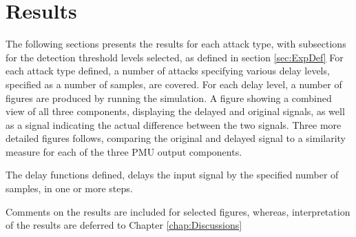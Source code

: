 \chapter{Results} \label{chap:Results}


The following sections presents the results for each attack type, with subsections for the detection threshold levels selected, as defined in section \ref{sec:ExpDef} 
For each attack type defined, a number of attacks specifying various delay levels, specified as a number of samples, are covered.
For each delay level, a number of figures are produced by running the simulation.
A figure showing a combined view of all three components, displaying the delayed and original signals, as well as a signal indicating the actual difference between the two signals.  Three more detailed figures follows, comparing the original and delayed signal to a similarity measure for each of the three PMU output components.

The delay functions defined, delays the input signal by the specified number of samples, in one or more steps.


Comments on the results are included for selected figures, whereas, interpretation of the results are deferred to Chapter \ref{chap:Discussions}

%





%

%

%

